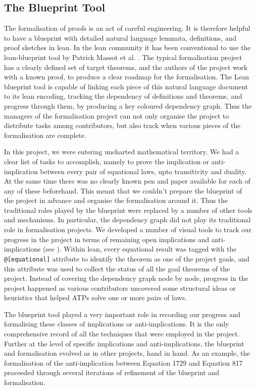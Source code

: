 \subsection{The Blueprint Tool}

The formalisation of proofs is an act of careful engineering. It is therefore helpful to  have a blueprint with detailed natural language lemmata, definitions, and proof sketches in lean. In the lean community it has been conventional to use the lean-blueprint tool by Patrick Massot et al. \cite{githubGitHubPatrickMassotleanblueprint}. The typical formalisation project has a clearly defined set of target theorems, and the authors of the project work with a known proof, to produce a clear roadmap for the formalisation. The Lean blueprint tool is capable of linking each piece of this natural language document to its lean encoding, tracking the dependency of definitions and theorems, and progress through them, by producing a key coloured dependency graph. Thus the managers of the formalisation project can not only organise the project to distribute tasks among contributors, but also track when various pieces of the formalisation are complete.

In this project, we were entering uncharted mathematical territory. We had a clear list of tasks to accomplish, namely to prove the implication or anti-implication between every pair of equational laws, upto transitivity and duality. At the same time there was no clearly known pen and paper available for each of any of these beforehand. This meant that we couldn't prepare the blueprint of the project in advance and organise the formalisation around it. Thus the traditional roles played by the blueprint were replaced by a number of other tools and mechanisms. In particular, the dependency graph did not play its traditional role in formalisation projects. We developed a number of visual tools to track our progress in the project  in terms of remaining open implications and anti-implications (see ). Within lean, every equational result was tagged with the \texttt{@[equational]} attribute to identify the theorem as one of the project goals, and this attribute was used to collect the status of all the goal theorems of the project. Instead of covering the dependency graph node by node, progress in the project happened as various contributors uncovered some structural ideas or heuristics that helped ATPs solve one or more pairs of laws.

The blueprint tool played a very important role in recording our progress and formalising these classes of implications or anti-implications. It is the only comprehensive record of all the techniques that were employed in the project. Further at the level of specific implications and anti-implications, the blueprint and formalisation evolved as in other projects, hand in hand. As an example, the formalisation of the anti-implication between Equation 1729 and Equation 817 proceeded through several iterations of refinement of the blueprint and formalisation.

